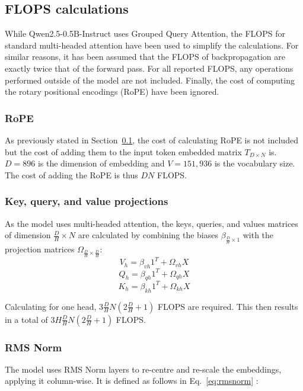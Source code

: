 \documentclass[11pt,a4paper]{article}
\begin{document}
\subsection{FLOPS calculations}
\label{sec:flops_calc}
While Qwen2.5-0.5B-Instruct uses Grouped Query Attention, the FLOPS for standard multi-headed attention have been used to simplify the calculations. For similar reasons, it has been assumed that the FLOPS of backpropagation are exactly twice that of the forward pass. For all reported FLOPS, any operations performed outside of the model are not included. Finally, the cost of computing the rotary positional encodings (RoPE) have been ignored.

\subsubsection{RoPE}
As previously stated in Section~\ref{sec:flops_calc}, the cost of calculating RoPE is not included but the cost of adding them to the input token embedded matrix $T_{D \times N}$ is. $D=896$ is the dimension of embedding and $V=151,936$ is the vocabulary size. The cost of adding the RoPE is thus $DN$ FLOPS.

\subsubsection{Key, query, and value projections}
As the model uses multi-headed attention, the keys, queries, and values matrices of dimension $\frac{D}{H}\times N$ are calculated by combining the biases $\beta_{\frac{D}{H} \times 1}$ with the projection matrices $\Omega_{\frac{D}{H}\times\frac{D}{H}}$:
\begin{equation}
    V_h = \beta_{vh} 1^T + \Omega_{vh} X
\end{equation}
\begin{equation}
    Q_h = \beta_{qh} 1^T + \Omega_{qh} X
\end{equation}
\begin{equation}
    K_h = \beta_{kh} 1^T + \Omega_{kh} X
\end{equation}

Calculating for one head, $3\frac{D}{H}N(2\frac{D}{H} + 1)$ FLOPS are required. This then results in a total of $3H\frac{D}{H}N(2\frac{D}{H} + 1)$ FLOPS.

\subsubsection{RMS Norm}
The model uses RMS Norm layers to re-centre and re-scale the embeddings, applying it column-wise. It is defined as follows in Eq.~\ref{eq:rmsnorm} \citep{zhang2019rootmeansquarelayer}:
\end{document}
